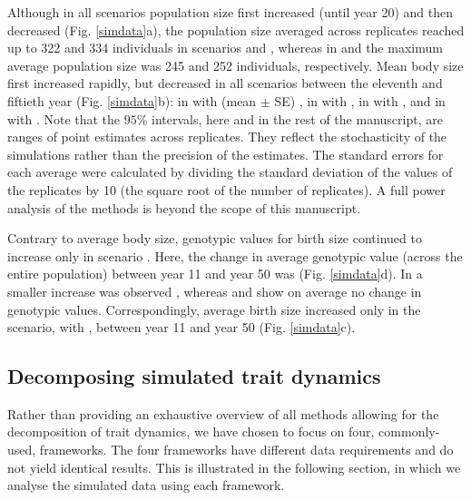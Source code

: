 Although in all scenarios population size first increased (until year 20) and then decreased (Fig. \ref{simdata}a), the  population size averaged across replicates reached up to 322 and 334 individuals in scenarios \Sh and \SH, whereas in \sh and \sH the maximum average population size was 245 and 252 individuals, respectively. Mean body size first increased rapidly, but decreased in all scenarios between the eleventh and fiftieth year (Fig. \ref{simdata}b): in \sh with (mean $\pm$ SE) , in \sH with , in \Sh with , and in \SH with . Note that the $95\%$ intervals, here and in the rest of the manuscript, are ranges of point estimates across replicates. They reflect the stochasticity of the simulations rather than the precision of the estimates. The standard errors for each average were calculated by dividing the standard deviation of the values of the replicates by 10 (the square root of the number of replicates). A full power analysis of the methods is beyond the scope of this manuscript.

Contrary to average body size, genotypic values for birth size continued to increase only in scenario \SH. Here, the change in average genotypic value (across the entire population) between year 11 and year 50 was  (Fig. \ref{simdata}d). In \Sh a smaller increase was observed , whereas \sh and \sH show on average no change in genotypic values. Correspondingly, average birth size increased only in the \SH scenario, with , between year 11 and year 50 (Fig. \ref{simdata}c). 



\subsection{Decomposing simulated trait dynamics}
Rather than providing an exhaustive overview of all methods allowing for the decomposition of trait dynamics, we have chosen to focus on four, commonly-used, frameworks. The four frameworks have different data requirements and do not yield identical results. This is illustrated in the following section, in which we analyse the simulated data using each framework.

